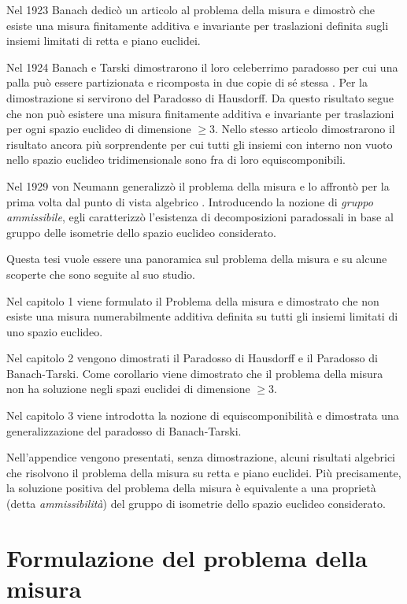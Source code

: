 \documentclass[a4paper,oneside,11pt]{book}
\theoremstyle{definition} \newtheorem{Def}{Definizione}
\theoremstyle{plain} \newtheorem{teo}{Teorema}
\theoremstyle{plain} \newtheorem{cor}[teo]{Corollario}
\theoremstyle{definition} \newtheorem{lem}[teo]{Lemma}
\theoremstyle{plain} \newtheorem{pro}[teo]{Proposizione}
\begin{document}
	Nel 1923 Banach dedicò un articolo al problema della misura \cite{mesure} e dimostrò che esiste una misura finitamente additiva e invariante per traslazioni definita sugli insiemi limitati di retta e piano euclidei.
	
	Nel 1924 Banach e Tarski dimostrarono il loro celeberrimo paradosso per cui una palla può essere partizionata e ricomposta in due copie di sé stessa \cite{bantar}. Per la dimostrazione si servirono del Paradosso di Hausdorff. Da questo risultato segue che non può esistere una misura finitamente additiva e invariante per traslazioni per ogni spazio euclideo di dimensione $\geq 3$. Nello stesso articolo dimostrarono il risultato ancora più sorprendente per cui tutti gli insiemi con interno non vuoto nello spazio euclideo tridimensionale sono fra di loro equiscomponibili.
	
	Nel 1929 von Neumann generalizzò il problema della misura e lo affrontò per la prima volta dal punto di vista algebrico \cite{john}. Introducendo la nozione di \emph{gruppo ammissibile}, egli caratterizzò l'esistenza di decomposizioni paradossali in base al gruppo delle isometrie dello spazio euclideo considerato.

	\bigskip

	Questa tesi vuole essere una panoramica sul problema della misura e su alcune scoperte che sono seguite al suo studio.
	
	Nel capitolo 1 viene formulato il Problema della misura e dimostrato che non esiste una misura numerabilmente additiva definita su tutti gli insiemi limitati di uno spazio euclideo.
	
	Nel capitolo 2 vengono dimostrati il Paradosso di Hausdorff e il Paradosso di Banach-Tarski. Come corollario viene dimostrato che il problema della misura non ha soluzione negli spazi euclidei di dimensione $\geq 3$.
	
	Nel capitolo 3 viene introdotta la nozione di equiscomponibilità e dimostrata una generalizzazione del paradosso di Banach-Tarski.
	
	Nell'appendice vengono presentati, senza dimostrazione, alcuni risultati algebrici che risolvono il problema della misura su retta e piano euclidei. Più precisamente,  la soluzione positiva del problema della misura  è equivalente a una proprietà (detta \emph{ammissibilità}) del gruppo di isometrie dello spazio euclideo considerato.

\chapter{Formulazione del problema della misura}
	
\end{document}
